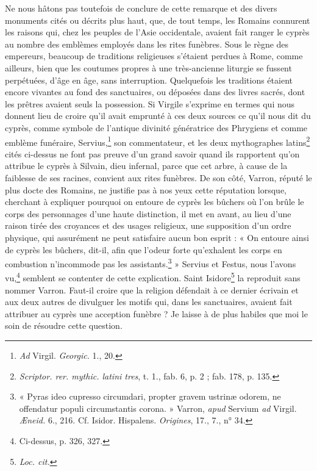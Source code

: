 \documentclass{article}
\begin{document}
Ne nous hâtons pas toutefois de conclure de cette remarque et des divers monuments cités ou décrits plus haut, que, de tout temps, les Romains connurent les raisons qui, chez les peuples de l'Asie occidentale, avaient fait ranger le cyprès au nombre des emblèmes employés dans les rites funèbres. Sous le règne des empereurs, beaucoup de traditions religieuses s'étaient perdues à Rome, comme ailleurs, bien que les coutumes propres à une très-ancienne liturgie se fussent perpétuées, d'âge en âge, sans interruption. Quelquefois les traditions étaient encore vivantes au fond des sanctuaires, ou déposées dans des livres sacrés, dont les prêtres avaient seuls la possession. Si Virgile s'exprime en termes qui nous donnent lieu de croire qu'il avait emprunté à ces deux sources ce qu'il nous dit du cyprès, comme symbole de l'antique divinité génératrice des Phrygiens et comme emblème funéraire, Servius,\footnote{\emph{Ad} Virgil. \emph{Georgic.} 1., 20.} son commentateur, et les deux mythographes latins\footnote{\emph{Scriptor. rer. mythic. latini tres}, t. 1., fab. 6, p. 2 ; fab. 178, p. 135.} cités ci-dessus ne font pas preuve d'un grand savoir quand ils rapportent qu'on attribue le cyprès à Silvain, dieu infernal, parce que cet arbre, à cause de la faiblesse de ses racines, convient aux rites funèbres. De son côté, Varron, réputé le plus docte des Romains, ne justifie pas à nos yeux cette réputation lorsque, cherchant à expliquer pourquoi on entoure de cyprès les bûchers où l'on brûle le corps des personnages d'une haute distinction, il met en avant, au lieu d'une raison tirée des croyances et des usages religieux, une supposition d'un ordre physique, qui assurément ne peut satisfaire aucun bon esprit : « On entoure ainsi de cyprès les bûchers, dit-il, afin que l'odeur forte qu'exhalent les corps en combustion n'incommode pas les assistants.\footnote{« Pyras ideo cupresso circumdari, propter gravem ustrinæ odorem, ne offendatur populi circumstantis corona. » Varron, \emph{apud} Servium \emph{ad} Virgil. \emph{Æneid.} 6., 216. Cf. Isidor. Hispalens. \emph{Origines}, 17., 7., n° 34.} » Servius et Festus, nous l'avons vu,\footnote{Ci-dessus, p. 326, 327.} semblent se contenter de cette explication. Saint Isidore\footnote{\emph{Loc. cit.}} la reproduit sans nommer Varron. Faut-il croire que la religion défendait à ce dernier écrivain et aux deux autres de divulguer les motifs qui, dans les sanctuaires, avaient fait attribuer au cyprès une acception funèbre ? Je laisse à de plus habiles que moi le soin de résoudre cette question.
\end{document}
